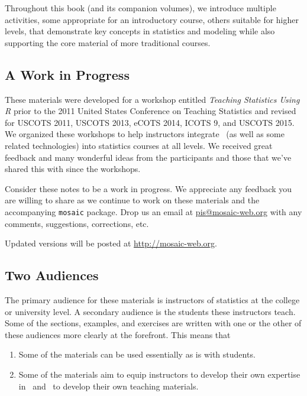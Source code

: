 \documentclass{tufte-book}\usepackage[]{graphicx}\usepackage[]{xcolor}
\renewcommand{\pkg}[1]{{\color{black}\texttt{#1}}}
\begin{document}
Throughout this book (and its companion volumes), we
introduce multiple activities, some
appropriate for an introductory course, others suitable for higher levels, that
demonstrate key concepts in statistics and modeling
while also supporting the core material of more traditional courses.

\subsection*{A Work in Progress}

%

These materials were developed for a workshop entitled 
\emph{Teaching Statistics Using R} prior to the 2011 United States Conference 
on Teaching Statistics and revised for USCOTS 2011, USCOTS 2013, eCOTS 2014, ICOTS 9, and USCOTS 2015.
We organized these workshops to help instructors integrate \R\ (as well as some related technologies) into statistics courses at all levels.
We received great feedback and many wonderful ideas from the participants and those that we've shared this with since the workshops.  

Consider these notes to be a work in progress.  
We appreciate any feedback you are willing to share as we continue
to work on these materials and the accompanying \pkg{mosaic} package.  
Drop us an email at \url{pis@mosaic-web.org} with any comments, suggestions,
corrections, etc.

Updated versions will be posted at \url{http://mosaic-web.org}.


\subsection*{Two Audiences}

The primary audience for these materials is instructors of statistics at the college or
university level.  A secondary audience is the students these instructors teach.  
Some of the sections, examples, and exercises are written with one or the other of 
these audiences more clearly at the forefront.  This means that 
\begin{enumerate}
\item Some of the materials can be used essentially as is with students.
\item Some of the materials aim to equip instructors to develop their own
expertise in \R\ and \RStudio\ to develop their own teaching materials.
\end{enumerate}
\end{document}
